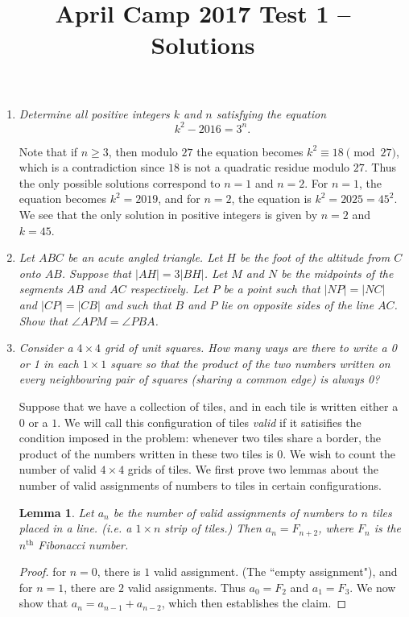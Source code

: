 \documentclass[a4paper,12pt]{article}
\title{April Camp 2017 Test 1 -- Solutions}
\date{}
\newtheorem{lemma}{Lemma}
\begin{document}
 \maketitle

\begin{enumerate}
	\item 
	\textit{Determine all positive integers $k$ and $n$ satisfying the equation $$k^2 - 2016 = 3^n.$$}
	
    Note that if $n \geq 3$, then modulo $27$ the equation becomes $k^2 \equiv
    18 \pmod{27}$, which is a contradiction since $18$ is not a quadratic residue
    modulo $27$. Thus the only possible solutions correspond to $n=1$ and
    $n=2$. For $n=1$, the equation becomes $k^2 = 2019$, and for $n=2$, the
    equation is $k^2 = 2025 = 45^2$. We see that the only solution in
    positive integers is given by $n=2$ and $k=45$.
		
	\item 
	\textit{Let $ABC$ be an acute angled triangle. Let $H$ be the foot of the altitude from $C$ onto $AB$. Suppose that $|AH|=3|BH|$. Let $M$ and $N$ be the midpoints of the segments $AB$ and $AC$ respectively. Let $P$ be a point such that $|NP|=|NC|$ and $|CP|=|CB|$ and such that $B$ and $P$ lie on opposite sides of the line $AC$. Show that $\angle APM = \angle PBA$.}
	
	
	
	\item
	\textit{Consider a $4 \times 4$ grid of unit squares. How many ways are there to write a 0 or 1 in each $1 \times 1$ square so that the product of the two numbers written on every neighbouring pair of squares (sharing a common edge) is always 0?}
	
    Suppose that we have a collection of tiles, and in each tile is written
    either a $0$ or a $1$. We will call this configuration of tiles
    \emph{valid} if it satisifies the condition imposed in the problem:
    whenever two tiles share a border, the product of the numbers written
    in these two tiles is $0$. We wish to count the number of valid $4 \times
    4$ grids of tiles. We first prove two lemmas about the number of valid
    assignments of numbers to tiles in certain configurations.

    \begin{lemma} \label{lemma:strip}
        Let $a_n$ be the number of valid assignments of numbers to $n$ tiles
        placed in a line. (i.e. a $1 \times n$ strip of tiles.) Then $a_n =
        F_{n+2}$, where $F_n$ is the $n^\text{th}$ Fibonacci number.
    \end{lemma}
    \begin{proof}
        for $n=0$, there is $1$ valid assignment. (The ``empty
        assignment"), and for $n=1$, there are $2$ valid assignments. Thus
        $a_0=F_2$ and $a_1=F_3$. We now show that $a_{n} = a_{n-1} + a_{n-2}$,
        which then establishes the claim.


\end{proof}
\end{enumerate}
\end{document}

